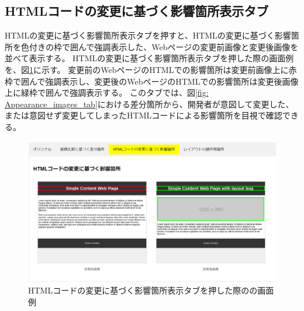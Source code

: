 \subsection{HTMLコードの変更に基づく影響箇所表示タブ}\label{subsec:html_tab}
HTMLの変更に基づく影響箇所表示タブを押すと、HTMLの変更に基づく影響箇所を色付きの枠で囲んで強調表示した、Webページの変更前画像と変更後画像を並べて表示する。
HTMLの変更に基づく影響箇所表示タブを押した際の画面例を、図\ref{fig: Appearance_html_tab}に示す。
変更前のWebページのHTMLでの影響箇所は変更前画像上に赤枠で囲んで強調表示し、変更後のWebページのHTMLでの影響箇所は変更後画像上に緑枠で囲んで強調表示する。
このタブでは、図\ref{fig: Appearance_images_tab}における差分箇所から、開発者が意図して変更した、または意図せず変更してしまったHTMLコードによる影響箇所を目視で確認できる。
\begin{figure}[tp]
    \begin{center}
        \includegraphics[width=1.0\columnwidth]{image/3_html_tab.png}
        \caption{HTMLコードの変更に基づく影響箇所表示タブを押した際の\toolName の画面例}
        \label{fig: Appearance_html_tab}
    \end{center}
\end{figure}



